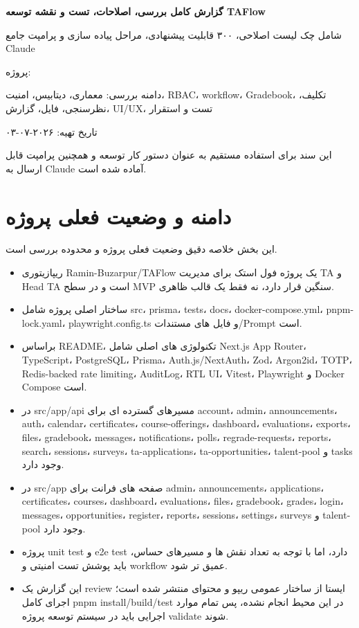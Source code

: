 \documentclass[11pt,a4paper]{article}
\begin{document}
\begin{titlepage}
\centering
\vspace*{2.5cm}
{\Huge\bfseries گزارش کامل بررسی، اصلاحات، تست و نقشه توسعه TAFlow\par}
\vspace{0.6cm}
{\Large شامل چک لیست اصلاحی، ۳۰۰ قابلیت پیشنهادی، مراحل پیاده سازی و پرامپت جامع Claude\par}
\vspace{1.5cm}
\begin{framed}
\centering
\Large پروژه: \par
\vspace{0.2cm}
\normalsize دامنه بررسی: معماری، دیتابیس، امنیت، RBAC، workflow، Gradebook، تکلیف، نظرسنجی، فایل، گزارش، UI/UX، تست و استقرار
\end{framed}
\vfill
{\large تاریخ تهیه: ۲۰۲۶-۰۷-۰۳\par}
\vspace{0.4cm}
{\small این سند برای استفاده مستقیم به عنوان دستور کار توسعه و همچنین پرامپت قابل ارسال به Claude آماده شده است.}
\end{titlepage}
\tableofcontents
\newpage
\section{دامنه و وضعیت فعلی پروژه}
این بخش خلاصه دقیق وضعیت فعلی پروژه و محدوده بررسی است.
\begin{itemize}
\item ریپازیتوری Ramin-Buzarpur/TAFlow یک پروژه فول استک برای مدیریت TA و Head TA است و در سطح MVP سنگین قرار دارد، نه فقط یک قالب ظاهری.
\item ساختار اصلی پروژه شامل src، prisma، tests، docs، docker-compose.yml، pnpm-lock.yaml، playwright.config.ts و فایل های مستندات/Prompt است.
\item براساس README، تکنولوژی های اصلی شامل Next.js App Router، TypeScript، PostgreSQL، Prisma، Auth.js/NextAuth، Zod، Argon2id، TOTP، Redis-backed rate limiting، AuditLog، RTL UI، Vitest، Playwright و Docker Compose است.
\item در src/app/api مسیرهای گسترده ای برای account، admin، announcements، auth، calendar، certificates، course-offerings، dashboard، evaluations، exports، files، gradebook، messages، notifications، polls، regrade-requests، reports، search، sessions، surveys، ta-applications، ta-opportunities، talent-pool و tasks وجود دارد.
\item در src/app صفحه های فرانت برای admin، announcements، applications، certificates، courses، dashboard، evaluations، files، gradebook، grades، login، messages، opportunities، register، reports، sessions، settings، surveys و talent-pool وجود دارد.
\item پروژه unit test و e2e test دارد، اما با توجه به تعداد نقش ها و مسیرهای حساس، باید پوشش تست امنیتی و workflow عمیق تر شود.
\item این گزارش یک review ایستا از ساختار عمومی ریپو و محتوای منتشر شده است؛ اجرای کامل pnpm install/build/test در این محیط انجام نشده، پس تمام موارد اجرایی باید در سیستم توسعه پروژه validate شوند.
\end{itemize}
\end{document}
